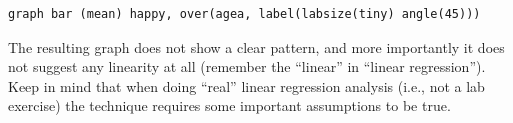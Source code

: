 \begin{lstlisting}
graph bar (mean) happy, over(agea, label(labsize(tiny) angle(45)))
\end{lstlisting}

The resulting graph does not show a clear pattern, and more importantly it does not suggest any linearity at all (remember the ``linear'' in ``linear regression''). Keep in mind that when doing ``real'' linear regression analysis (i.e., not a lab exercise) the technique requires some important assumptions to be true.
